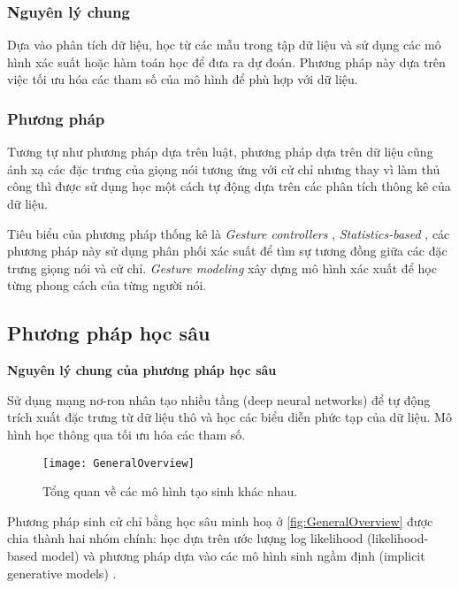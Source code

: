 \subsubsection{Nguyên lý chung}

Dựa vào phân tích dữ liệu, học từ các mẫu trong tập dữ liệu và sử dụng các mô hình xác suất hoặc hàm toán học để đưa ra dự đoán. Phương pháp này dựa trên việc tối ưu hóa các tham số của mô hình để phù hợp với dữ liệu.

\subsubsection{Phương pháp}

Tương tự như phương pháp dựa trên luật, phương pháp dựa trên dữ liệu cũng ánh xạ các đặc trưng của giọng nói tương ứng với cử chỉ nhưng thay vì làm thủ công thì được sử dụng học một cách tự động dựa trên các phân tích thông kê của dữ liệu.

Tiêu biểu của phương pháp thống kê là \textit{Gesture controllers} \cite{levine2010gesture}, \textit{Statistics-based} \cite{yang2020statistics}, các phương pháp này sử dụng phân phối xác suất để tìm sự tương đồng giữa các đặc trưng giọng nói và cử chỉ. \textit{Gesture modeling}  \cite{neff2008gesture} xây dựng mô hình xác xuất để học từng phong cách của từng người nói.

\subsection{Phương pháp học sâu}

\textbf{Nguyên lý chung của phương pháp học sâu}

Sử dụng mạng nơ-ron nhân tạo nhiều tầng (deep neural networks) để tự động trích xuất đặc trưng từ dữ liệu thô và học các biểu diễn phức tạp của dữ liệu. Mô hình học thông qua tối ưu hóa các tham số.

\begin{figure}[H]
	\centering
	\texttt{[image: GeneralOverview]}
	\caption{Tổng quan về các mô hình tạo sinh khác nhau.}
	\label{fig:GeneralOverview}
\end{figure}

Phương pháp sinh cử chỉ bằng học sâu minh hoạ ở \autoref{fig:GeneralOverview} được chia thành hai nhóm chính: học dựa trên ước lượng log likelihood (likelihood-based model)  và phương pháp dựa vào các mô hình sinh ngầm định (implicit generative models) \cite{song2021score}.

